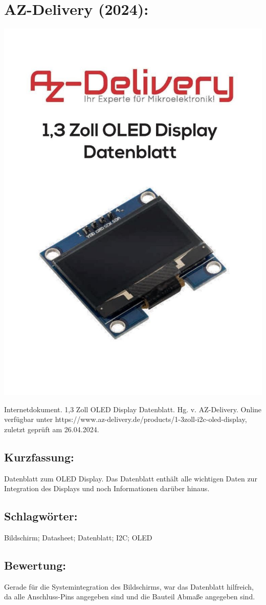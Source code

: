 \section*{AZ-Delivery (2024):}
\begin{minipage}{0.5\textwidth}
	\includegraphics[width=\linewidth]{../Appendix/Literaturverzeichnis/img/AZ.jpg}
\end{minipage}
\hfill
\begin{minipage}{0.48\textwidth}
Internetdokument. 1,3 Zoll OLED Display Datenblatt.
Hg. v. AZ-Delivery. Online verfügbar unter https://www.az-delivery.de/products/1-3zoll-i2c-oled-display, zuletzt geprüft am 26.04.2024.
\subsection*{Kurzfassung:}
Datenblatt zum OLED Display. Das Datenblatt enthält alle wichtigen Daten zur Integration des Displays und noch Informationen darüber hinaus.	
\subsection*{Schlagwörter:}
Bildschirm; Datasheet; Datenblatt; I2C; OLED
\subsection*{Bewertung:}
Gerade für die Systemintegration des Bildschirms, war das Datenblatt hilfreich, da alle Anschluss-Pins angegeben sind und die Bauteil Abmaße angegeben sind.
\end{minipage}

